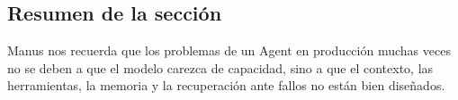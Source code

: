 \subsection{Resumen de la sección}

Manus nos recuerda que los problemas de un Agent en producción muchas veces no se deben a que el modelo carezca de capacidad, sino a que el contexto, las herramientas, la memoria y la recuperación ante fallos no están bien diseñados.
